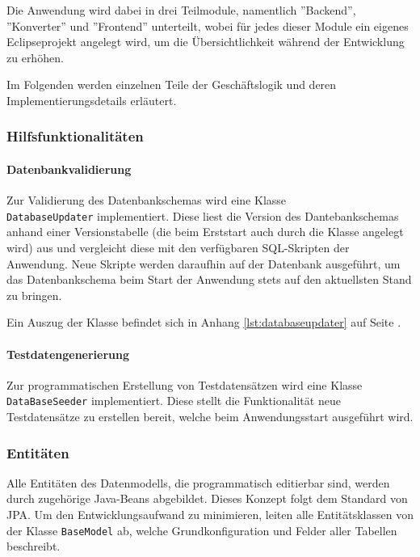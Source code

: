 \documentclass[12pt, xcolor=dvipsnames]{scrartcl}
\begin{document}
Die Anwendung wird dabei in drei Teilmodule, namentlich ''Backend'', ''Konverter'' und ''Frontend'' unterteilt, wobei für jedes dieser Module ein eigenes Eclipseprojekt angelegt wird, um die Übersichtlichkeit während der Entwicklung zu erhöhen.

Im Folgenden werden einzelnen Teile der Geschäftslogik und deren Implementierungsdetails erläutert.

\subsubsection*{Hilfsfunktionalitäten}

\paragraph*{Datenbankvalidierung}
Zur Validierung des Datenbankschemas wird eine Klasse \\\texttt{DatabaseUpdater} implementiert. Diese liest die Version des Dantebankschemas anhand einer Versionstabelle (die beim Erststart auch durch die Klasse angelegt wird) aus und vergleicht diese mit den verfügbaren SQL-Skripten der Anwendung. Neue Skripte werden daraufhin auf der Datenbank ausgeführt, um das Datenbankschema beim Start der Anwendung stets auf den aktuellsten Stand zu bringen.

Ein Auszug der Klasse befindet sich in Anhang \ref{lst:databaseupdater} auf Seite \pageref{lst:databaseupdater}.

\paragraph*{Testdatengenerierung}
Zur programmatischen Erstellung von Testdatensätzen wird eine Klasse \texttt{DataBaseSeeder} implementiert. Diese stellt die Funktionalität neue Testdatensätze zu erstellen bereit, welche beim Anwendungsstart ausgeführt wird.

\subsubsection*{Entitäten}

Alle Entitäten des Datenmodells, die programmatisch editierbar sind, werden durch zugehörige Java-Beans abgebildet. Dieses Konzept folgt dem Standard von JPA. Um den Entwicklungsaufwand zu minimieren, leiten alle Entitätsklassen von der Klasse \texttt{BaseModel} ab, welche Grundkonfiguration und Felder aller Tabellen beschreibt.
\end{document}
